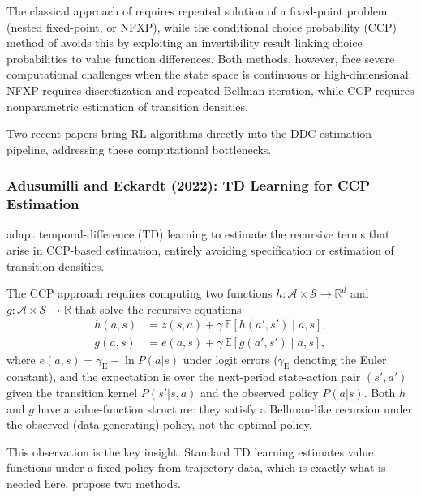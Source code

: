 The classical approach of \citet{Rust1987} requires repeated solution of a fixed-point problem (nested fixed-point, or NFXP), while the conditional choice probability (CCP) method of \citet{HotzMiller1993} avoids this by exploiting an invertibility result linking choice probabilities to value function differences. Both methods, however, face severe computational challenges when the state space is continuous or high-dimensional: NFXP requires discretization and repeated Bellman iteration, while CCP requires nonparametric estimation of transition densities.

Two recent papers bring RL algorithms directly into the DDC estimation pipeline, addressing these computational bottlenecks.


\subsubsection{Adusumilli and Eckardt (2022): TD Learning for CCP Estimation}

\citet{AdusumilliEckardt2022} adapt temporal-difference (TD) learning to estimate the recursive terms that arise in CCP-based estimation, entirely avoiding specification or estimation of transition densities.

The CCP approach requires computing two functions $h: \mathcal{A} \times \mathcal{S} \to \mathbb{R}^d$ and $g: \mathcal{A} \times \mathcal{S} \to \mathbb{R}$ that solve the recursive equations
\begin{align}
h(a,s) &= z(s,a) + \gamma \, \mathbb{E}[h(a', s') \mid a, s], \label{eq:ae_h}\\
g(a,s) &= e(a,s) + \gamma \, \mathbb{E}[g(a', s') \mid a, s], \label{eq:ae_g}
\end{align}
where $e(a,s) = \gamma_{\text{E}} - \ln P(a|s)$ under logit errors ($\gamma_{\text{E}}$ denoting the Euler constant), and the expectation is over the next-period state-action pair $(s', a')$ given the transition kernel $P(s'|s,a)$ and the observed policy $P(a|s)$. Both $h$ and $g$ have a value-function structure: they satisfy a Bellman-like recursion under the observed (data-generating) policy, not the optimal policy.

This observation is the key insight. Standard TD learning estimates value functions under a fixed policy from trajectory data, which is exactly what is needed here. \citet{AdusumilliEckardt2022} propose two methods.

